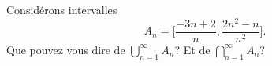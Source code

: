 
\begin{exercice}\label{exo0074}

Considérons intervalles
\[
	A_n=\Big[\frac{-3n+2}{n}, \frac{2n^2-n}{n^2}\Big].
\]
Que pouvez vous dire de $\bigcup_{n=1}^{\infty} A_n$? Et de $\bigcap_{n=1}^{\infty} A_n$?

\end{exercice}
